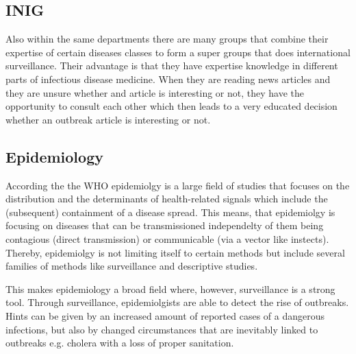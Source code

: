 \subsection{INIG}
Also within the same departments there are many groups that combine their
expertise of certain diseases classes to form a super groups that does international
surveillance. Their advantage is that they have expertise knowledge in different
parts of infectious disease medicine. When they are reading news articles and they
are unsure whether and article is interesting or not, they have the opportunity
to consult each other which then leads to a very educated decision whether an
outbreak article is interesting or not.

\subsection{Epidemiology}
According the the WHO \cite{WHOepi} epidemiolgy is a large field of studies that focuses
on the distribution and the determinants of health-related signals which include the (subsequent)
containment of a disease spread. This means, that epidemiolgy is focusing on diseases that can be
transmissioned independelty of them being contagious (direct transmission) or communicable (via a vector like instects).  Thereby, epidemiolgy is not limiting itself to certain methods but include several families of
methods like surveillance and descriptive studies.

This makes epidemiology a broad field where, however, surveillance is a strong tool. Through surveillance,
epidemiolgists are able to detect the rise of outbreaks. Hints can be given by an increased amount of reported cases of a dangerous infections, but also by changed circumstances that are inevitably linked to outbreaks e.g. cholera with a loss of proper sanitation.
